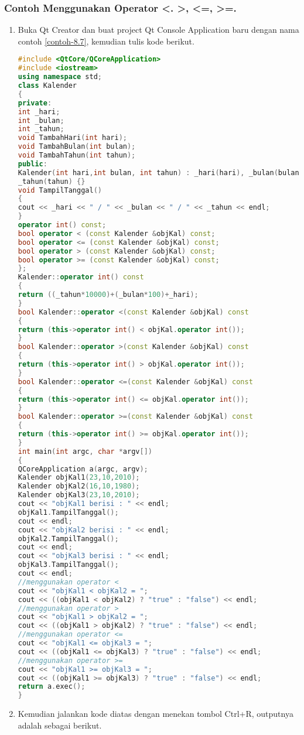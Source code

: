 \subsubsection*{Contoh  Menggunakan Operator \textless{}. \textgreater{}, \textless{}=, \textgreater{}=.}
\begin{enumerate}

\item
  Buka Qt Creator dan buat project Qt Console Application baru dengan
  nama contoh \ref{contoh-8.7}, kemudian tulis kode berikut.

\begin{lstlisting}[language=c++, caption=Menggunakan Operator Overloading, label=contoh-8.7]
#include <QtCore/QCoreApplication>
#include <iostream>
using namespace std;
class Kalender
{
private:
int _hari;
int _bulan;
int _tahun;
void TambahHari(int hari);
void TambahBulan(int bulan);
void TambahTahun(int tahun);
public:
Kalender(int hari,int bulan, int tahun) : _hari(hari), _bulan(bulan),
_tahun(tahun) {}
void TampilTanggal()
{
cout << _hari << " / " << _bulan << " / " << _tahun << endl;
}
operator int() const;
bool operator < (const Kalender &objKal) const;
bool operator <= (const Kalender &objKal) const;
bool operator > (const Kalender &objKal) const;
bool operator >= (const Kalender &objKal) const;
};
Kalender::operator int() const
{
return ((_tahun*10000)+(_bulan*100)+_hari);
}
bool Kalender::operator <(const Kalender &objKal) const
{
return (this->operator int() < objKal.operator int());
}
bool Kalender::operator >(const Kalender &objKal) const
{
return (this->operator int() > objKal.operator int());
}
bool Kalender::operator <=(const Kalender &objKal) const
{
return (this->operator int() <= objKal.operator int());
}
bool Kalender::operator >=(const Kalender &objKal) const
{
return (this->operator int() >= objKal.operator int());
}
int main(int argc, char *argv[])
{
QCoreApplication a(argc, argv);
Kalender objKal1(23,10,2010);
Kalender objKal2(16,10,1980);
Kalender objKal3(23,10,2010);
cout << "objKal1 berisi : " << endl;
objKal1.TampilTanggal();
cout << endl;
cout << "objKal2 berisi : " << endl;
objKal2.TampilTanggal();
cout << endl;
cout << "objKal3 berisi : " << endl;
objKal3.TampilTanggal();
cout << endl;
//menggunakan operator <
cout << "objKal1 < objKal2 = ";
cout << ((objKal1 < objKal2) ? "true" : "false") << endl;
//menggunakan operator >
cout << "objKal1 > objKal2 = ";
cout << ((objKal1 > objKal2) ? "true" : "false") << endl;
//menggunakan operator <=
cout << "objKal1 <= objKal3 = ";
cout << ((objKal1 <= objKal3) ? "true" : "false") << endl;
//menggunakan operator >=
cout << "objKal1 >= objKal3 = ";
cout << ((objKal1 >= objKal3) ? "true" : "false") << endl;
return a.exec();
}
\end{lstlisting}
\item
  Kemudian jalankan kode diatas dengan menekan tombol Ctrl+R, outputnya
  adalah sebagai berikut.
\end{enumerate}

